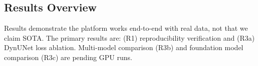 
\subsection{Results Overview}

Results demonstrate the platform works end-to-end with real data, not that we claim SOTA.
The primary results are: (R1) reproducibility verification and (R3a) DynUNet loss ablation.
Multi-model comparison (R3b) and foundation model comparison (R3c) are pending GPU runs.



